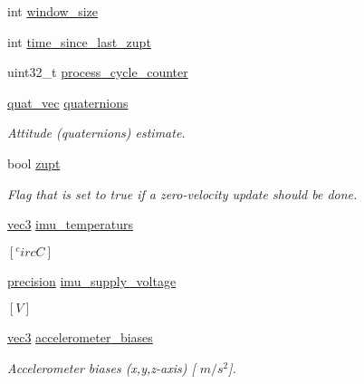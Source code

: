 \begin{DoxyCompactItemize}
int \hyperlink{group__tables_ga1c7df51cd44a9862d56e5a86a7382fe2}{window\-\_\-size}
\item 
int \hyperlink{group__tables_ga20193da701b182264e8b7bf63293c0f9}{time\-\_\-since\-\_\-last\-\_\-zupt}
\item 
uint32\-\_\-t \hyperlink{group__tables_ga69242006691a47df6ea85e8cc45ccc43}{process\-\_\-cycle\-\_\-counter}
\item 
\hyperlink{nav__types_8h_ad9a64f455fa02affaba6740746aae7b2}{quat\-\_\-vec} \hyperlink{group__tables_ga059b83d370e7e6a5e9728a8f91943051}{quaternions}
\begin{DoxyCompactList}\small\item\em \-Attitude (quaternions) estimate. \end{DoxyCompactList}\item 
bool \hyperlink{group__tables_gabd51dc1d49060099533807a22acc61d4}{zupt}
\begin{DoxyCompactList}\small\item\em \-Flag that is set to true if a zero-\/velocity update should be done. \end{DoxyCompactList}\item 
\hyperlink{nav__types_8h_a90c683614d896321009d3b3c401b764f}{vec3} \hyperlink{group__tables_gacd438fa96131e9024d8ad206d83ffb66}{imu\-\_\-temperaturs}
\begin{DoxyCompactList}\small\item\em $[^circ C]$ \end{DoxyCompactList}\item 
\hyperlink{nav__types_8h_a37e1884b1f06826c49607cec459b4e8a}{precision} \hyperlink{group__tables_ga3f561003deb253bcc716a6c690c87cfe}{imu\-\_\-supply\-\_\-voltage}
\begin{DoxyCompactList}\small\item\em $[V]$ \end{DoxyCompactList}\item 
\hyperlink{nav__types_8h_a90c683614d896321009d3b3c401b764f}{vec3} \hyperlink{group__tables_ga1089eea940f41eff26a6cba1172089e9}{accelerometer\-\_\-biases}
\begin{DoxyCompactList}\small\item\em \-Accelerometer biases (x,y,z-\/axis) \mbox{[} $m/s^2$\mbox{]}. \end{DoxyCompactList}\end{DoxyCompactItemize}
